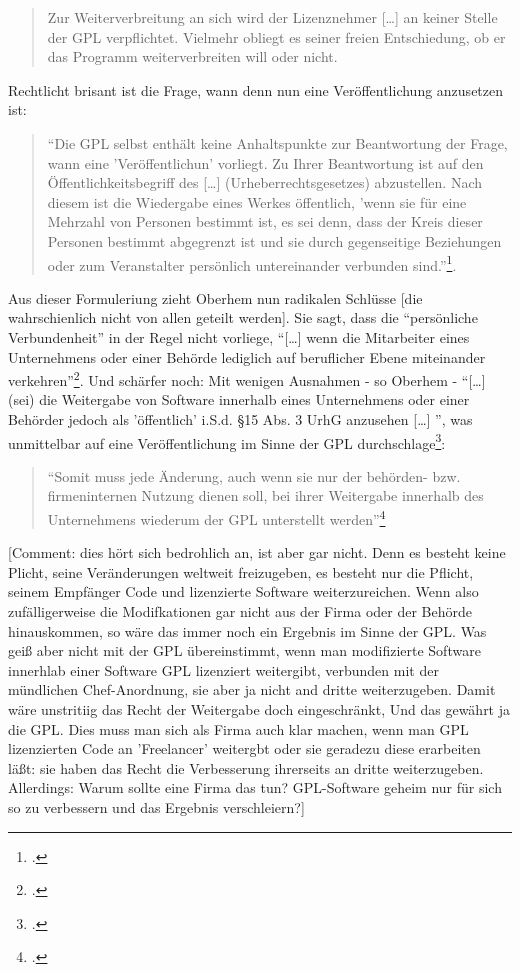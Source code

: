 \documentclass[DIV=calc,BCOR=5mm,11pt,headings=small,oneside,abstract=true, toc=bib]{scrartcl}
\begin{document}
\begin{quote} Zur Weiterverbreitung an sich wird der Lizenznehmer [\ldots] an
keiner Stelle der GPL verpflichtet. Vielmehr obliegt es seiner freien
Entschiedung, ob er das Programm weiterverbreiten will oder nicht.
\end{quote}



Rechtlicht brisant ist die Frage, wann denn nun eine Veröffentlichung
anzusetzen ist:

\begin{quote} \enquote{Die GPL selbst enthält keine Anhaltspunkte zur
Beantwortung der Frage, wann eine 'Veröffentlichun' vorliegt. Zu Ihrer
Beantwortung ist auf den Öffentlichkeitsbegriff des [\ldots]
(Urheberrechtsgesetzes) abzustellen. Nach diesem ist die Wiedergabe eines
Werkes öffentlich, 'wenn sie für eine Mehrzahl von Personen bestimmt ist,
es sei denn, dass der Kreis dieser Personen bestimmt abgegrenzt ist und
sie durch gegenseitige Beziehungen oder zum Veranstalter persönlich
untereinander verbunden sind.}\footcite[vgl.][45]{Oberhem2008a}.
\end{quote}

Aus dieser Formuleriung zieht Oberhem nun radikalen Schlüsse [die
wahrschienlich nicht von allen geteilt werden]. Sie sagt, dass die
\enquote{persönliche Verbundenheit} in der Regel nicht vorliege,
\enquote{[\ldots] wenn die Mitarbeiter eines Unternehmens oder einer
Behörde lediglich auf beruflicher Ebene miteinander
verkehren}\footcite[vgl.][45]{Oberhem2008a}. Und schärfer noch: Mit
wenigen Ausnahmen - so Oberhem - \enquote{[\ldots] (sei) die Weitergabe von
Software innerhalb eines Unternehmens oder einer Behörder jedoch als
'öffentlich' i.S.d. §15 Abs. 3 UrhG anzusehen [\ldots] }, was unmittelbar
auf eine Veröffentlichung im Sinne der GPL
durchschlage\footcite[vgl.][46]{Oberhem2008a}:

\begin{quote} \enquote{Somit muss jede Änderung, auch wenn sie nur der
behörden- bzw. firmeninternen Nutzung dienen soll, bei ihrer Weitergabe
innerhalb des Unternehmens wiederum der GPL unterstellt
werden}\footcite[vgl.][46]{Oberhem2008a}
\end{quote}

[Comment: dies hört sich bedrohlich an, ist aber gar nicht. Denn es besteht
keine Plicht, seine Veränderungen weltweit freizugeben, es besteht nur die
Pflicht, seinem Empfänger Code und lizenzierte Software weiterzureichen. Wenn
also zufälligerweise die Modifkationen gar nicht aus der Firma oder der Behörde
hinauskommen, so wäre das immer noch ein Ergebnis im Sinne der GPL. Was geiß
aber nicht mit der GPL übereinstimmt, wenn man modifizierte Software innerhlab
einer Software GPL lizenziert weitergibt, verbunden mit der mündlichen
Chef-Anordnung, sie aber ja nicht and dritte weiterzugeben. Damit wäre
unstritiig das Recht der Weitergabe doch eingeschränkt, Und das gewährt ja die
GPL. Dies muss man sich als Firma auch klar machen, wenn man GPL lizenzierten
Code an 'Freelancer' weitergbt oder sie geradezu diese erarbeiten läßt: sie
haben das Recht die Verbesserung ihrerseits an dritte weiterzugeben.
Allerdings: Warum sollte eine Firma das tun? GPL-Software geheim nur für sich
so zu verbessern und das Ergebnis verschleiern?]
\end{document}
